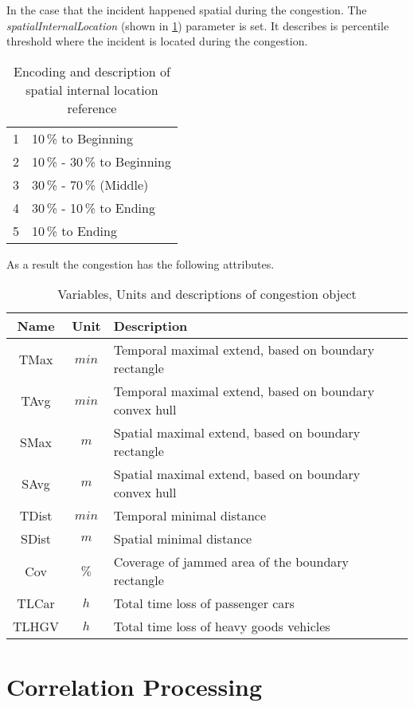 In the case that the incident happened spatial during the congestion. The \textit{spatialInternalLocation} (shown in \cref{tbl:jam_classification_ILS}) parameter is set. It describes is percentile threshold where the incident is located during the congestion.
\begin{table}[ht]
	\centering
	\begin{tabular}{c|l}  
		1 & 10\,\% to Beginning \\
 		2 & 10\,\% - 30\,\% to Beginning \\
 		3 & 30\,\% - 70\,\% (Middle) \\
 		4 & 30\,\% - 10\,\% to Ending \\
 		5 & 10\,\% to Ending \\
	\end{tabular}
	\caption{Encoding and description of spatial internal location reference}
	\label{tbl:jam_classification_ILS}
	\vspace{-4mm}
\end{table}
    
As a result the congestion has the following attributes.
\begin{table}[ht]
	\centering
	\begin{tabular}{c|c|l} 
		\toprule
		Name & Unit & Description \\
		\midrule 
		TMax  & $min$ & Temporal maximal extend, based on boundary rectangle \\
		TAvg  & $min$ & Temporal maximal extend, based on boundary convex hull \\
		SMax  & $m$   & Spatial maximal extend, based on boundary rectangle \\
		SAvg  & $m$   & Spatial maximal extend, based on boundary convex hull \\
		TDist & $min$ & Temporal minimal distance \\
		SDist & $m$   & Spatial minimal distance \\
		Cov   & $\%$  & Coverage of jammed area of the boundary rectangle \\
		TLCar & $h$   & Total time loss of passenger cars \\
		TLHGV & $h$   & Total time loss of heavy goods vehicles \\
		\bottomrule
	\end{tabular}
	\caption{Variables, Units and descriptions of congestion object}
\end{table}

\section{Correlation Processing}
\label{methodology_correlation_processing}

